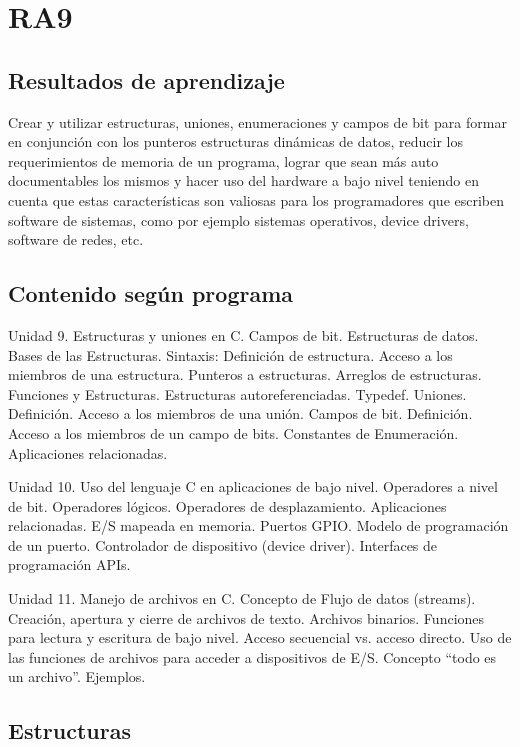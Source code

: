\section{RA9}
\subsection*{Resultados de aprendizaje}
Crear y utilizar estructuras, uniones, enumeraciones y campos de bit para formar en conjunción con los punteros estructuras dinámicas de datos, reducir los requerimientos de memoria de un programa, lograr que sean más auto documentables los mismos y hacer uso del hardware a bajo nivel teniendo en cuenta que estas características son valiosas para los programadores que escriben software de sistemas, como por ejemplo sistemas operativos, device drivers, software de redes, etc.

\subsection*{Contenido según programa}
Unidad 9. Estructuras y uniones en C. Campos de bit.  Estructuras de datos. Bases de las Estructuras. Sintaxis: Definición de estructura.  Acceso a los miembros de una estructura. Punteros a estructuras. Arreglos de estructuras. Funciones y Estructuras. Estructuras autoreferenciadas. Typedef.  Uniones. Definición. Acceso a los miembros de una unión. Campos de bit.  Definición. Acceso a los miembros de un campo de bits. Constantes de Enumeración. Aplicaciones relacionadas.

Unidad 10. Uso del lenguaje C en aplicaciones de bajo nivel.  Operadores a nivel de bit.  Operadores lógicos.  Operadores de desplazamiento.  Aplicaciones relacionadas.  E/S mapeada en memoria.  Puertos GPIO. Modelo de programación de un puerto.  Controlador de dispositivo (device driver). Interfaces de programación APIs.

Unidad 11. Manejo de archivos en C.  Concepto de Flujo de datos (streams). Creación, apertura y cierre de archivos de texto. Archivos binarios.  Funciones para lectura y escritura de bajo nivel.  Acceso secuencial vs.  acceso directo. Uso de las funciones de archivos para acceder a dispositivos de E/S. Concepto ``todo es un archivo''. Ejemplos.

\setcounter{subsection}{9}

\subsection*{Estructuras}

